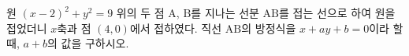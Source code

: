 원 $(x-2)^2 + y^2 = 9$ 위의 두 점 $\mathrm{A}$, $\mathrm{B}$를 지나는 선분 $\mathrm{AB}$를 접는 선으로 하여 원을 접었더니 $x$축과 점 $(4, 0)$에서 접하였다.
직선 $\mathrm{AB}$의 방정식을 $x + ay + b = 0$이라 할 때, $a + b$의 값을 구하시오.
